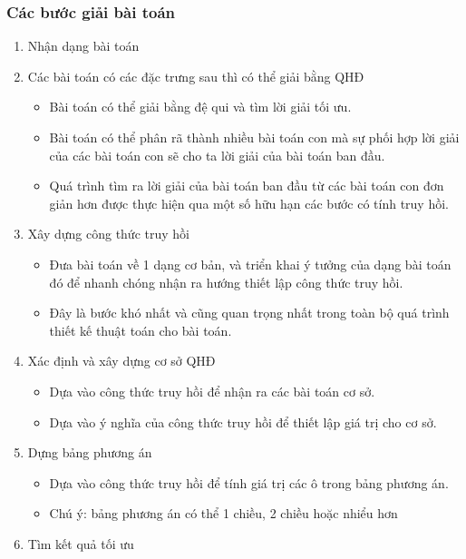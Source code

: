 \subsubsection{Các bước giải bài toán}
\begin{enumerate}
    \item{Nhận dạng bài toán}
    \item[]Các bài toán có các đặc trưng sau thì có thể giải bằng QHĐ
        \begin{itemize}
            \item Bài toán có thể giải bằng đệ qui và tìm lời giải tối ưu.
            \item Bài toán có thể phân rã thành nhiều bài toán con mà sự phối hợp lời giải của các bài toán con sẽ cho ta lời giải của bài toán ban đầu.
            \item Quá trình tìm ra lời giải của bài toán ban đầu từ các bài toán con đơn giản hơn được thực hiện qua một số hữu hạn các bước có tính truy hồi.
        \end{itemize}
    \item Xây dựng công thức truy hồi
        \begin{itemize}
            \item Đưa bài toán về 1 dạng cơ bản, và triển khai ý tưởng của dạng bài toán đó để nhanh chóng nhận ra hướng thiết lập công thức truy hồi.
            \item Đây là bước khó nhất và cũng quan trọng nhất trong toàn bộ quá trình thiết kế thuật toán cho bài toán.
        \end{itemize}
    \item Xác định và xây dựng cơ sở QHĐ
        \begin{itemize}
            \item Dựa vào công thức truy hồi để nhận ra các bài toán cơ sở.
            \item Dựa vào ý nghĩa của công thức truy hồi để thiết lập giá trị cho cơ sở.
        \end{itemize}
    \item Dựng bảng phương án
        \begin{itemize}
            \item Dựa vào công thức truy hồi để tính giá trị các ô trong bảng phương án.
            \item Chú ý: bảng phương án có thể 1 chiều, 2 chiều hoặc nhiểu hơn
        \end{itemize}
    \item Tìm kết quả tối ưu
        \begin{itemize}

\end{itemize}
\end{enumerate}
